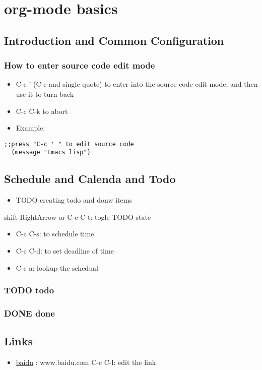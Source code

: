\documentclass[11pt]{article}
\begin{document}
\section{org-mode basics}
\label{sec:orga698717}
\subsection{Introduction and Common Configuration}
\label{sec:org80d1339}
\subsubsection{How to enter source code edit mode}
\label{sec:org373ad55}
\begin{itemize}
\item C-c ' (C-c and single quote) to enter into the source code edit mode, and then use it to turn back
\item C-c C-k to abort
\item Example:
\end{itemize}
\begin{verbatim}
;;press "C-c ' " to edit source code
  (message "Emacs lisp")
\end{verbatim}
\subsection{Schedule and Calenda and Todo}
\label{sec:orga95cd24}
\begin{itemize}
\item TODO creating todo and donw items
\end{itemize}

shift-RightArrow or C-c C-t: togle TODO state
\begin{itemize}
\item C-c C-s: to schedule time
\item C-c C-d: to set deadline of time
\item C-c a: lookup the schedual
\end{itemize}
\subsubsection{{\bfseries\sffamily TODO} todo}
\label{sec:orgb086bde}
\subsubsection{{\bfseries\sffamily DONE} done}
\label{sec:org54cf4bd}
\subsection{Links}
\label{sec:orge5f1d9b}
\begin{itemize}
\item \href{http:www.baidu.com}{baidu} : www.baidu.com  C-c C-l: edit the link
\end{itemize}
\end{document}
